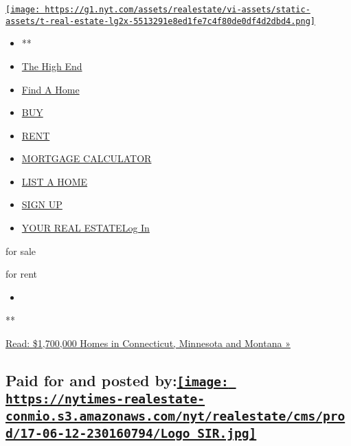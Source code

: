 \href{/section/realestate}{\texttt{[image: https://g1.nyt.com/assets/realestate/vi-assets/static-assets/t-real-estate-lg2x-5513291e8ed1fe7c4f80de0df4d2dbd4.png]}}

\begin{itemize}
\tightlist
\item
  **
\item
  \href{/real-estate/the-high-end}{The High End}
\item
  \href{/real-estate/find-a-home}{Find A Home}
\item
  \href{/real-estate/homes-for-sale}{BUY}
\item
  \href{/real-estate/homes-for-rent}{RENT}
\item
  \href{/real-estate/mortgage-calculator}{MORTGAGE CALCULATOR}
\item
  \href{https://nytimesads.gtspayments.com}{LIST A HOME}
\item
  \href{https://myaccount.nytimes.com/auth/register?client_id=real.estate.ui\&display=control\&redirect_uri=\%2Freal-estate\%2Ffind-a-home\%3F\&response_type=cookie}{SIGN
  UP}
\item
  \href{https://myaccount.nytimes.com/auth/login?client_id=real.estate.ui\&display=control\&redirect_uri=\%2Freal-estate\%2Ffind-a-home\%3F\&response_type=cookie}{YOUR
  REAL ESTATELog In}
\end{itemize}

for sale

for rent

\begin{itemize}
\item
\end{itemize}

**

\href{https://www.nytimes.com/2017/02/22/realestate/compare-homes-in-connecticut-minnesota-and-montana.html}{Read:
\$1,700,000 Homes in Connecticut, Minnesota and Montana »}

\hypertarget{paid-for-and-posted-bysothebys-international-realty-logo}{%
\subsection[Paid for and posted by:]{\texorpdfstring{Paid for and posted
by:\href{http://www.sothebysrealty.com/eng}{\protect\texttt{[image: https://nytimes-realestate-conmio.s3.amazonaws.com/nyt/realestate/cms/prod/17-06-12-230160794/Logo\_SIR.jpg]}}}{Paid for and posted by:Sotheby's International Realty logo}}\label{paid-for-and-posted-bysothebys-international-realty-logo}}

